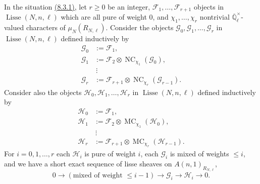 In the situation \hyperref[par:8.3.1]{(8.3.1)}, let \(r\geq0\) be an integer, \(\mathcal{F}_1,\ldots,\mathcal{F}_{r+1}\) objects in \(\operatorname{Lisse}(N,n,\ell)\) which are all pure of weight \(0\), and \(\chi_1,\ldots,\chi_r\) nontrivial \(\overline{\mathbb{Q}}_\ell^{\times}\)-valued characters of \(\mu_N(R_{N,\ell})\). Consider the objects \(\mathcal{G}_0,\mathcal{G}_1,\ldots,\mathcal{G}_r\) in \(\operatorname{Lisse}(N,n,\ell)\) defined inductively by
\[
\begin{aligned}
\mathcal{G}_0&:=\mathcal{F}_1,\\
\mathcal{G}_1&:=\mathcal{F}_2\otimes\operatorname{NC}_{\chi_1}(\mathcal{G}_0),\\
&\ \vdots\\
\mathcal{G}_r&:=\mathcal{F}_{r+1}\otimes\operatorname{NC}_{\chi_r}(\mathcal{G}_{r-1}).
\end{aligned}
\]
Consider also the objects \(\mathcal{H}_0,\mathcal{H}_1,\ldots,\mathcal{H}_r\) in \(\operatorname{Lisse}(N,n,\ell)\) defined inductively by
\[
\begin{aligned}
\mathcal{H}_0&:=\mathcal{F}_1,\\
\mathcal{H}_1&:=\mathcal{F}_2\otimes\operatorname{MC}_{\chi_1}(\mathcal{H}_0),\\
&\ \vdots\\
\mathcal{H}_r&:=\mathcal{F}_{r+1}\otimes\operatorname{MC}_{\chi_r}(\mathcal{H}_{r-1}).
\end{aligned}
\]
For \(i=0,1,\ldots,r\) each \(\mathcal{H}_i\) is pure of weight \(i\), each \(\mathcal{G}_i\) is mixed of weights \(\leq i\), and we have a short exact sequence of lisse sheaves on \(A(n,1)_{R_{N,\ell}}\),
\[
0\to(\text{mixed of weight }\leq i-1)\to\mathcal{G}_i\to\mathcal{H}_i\to0.
\]
